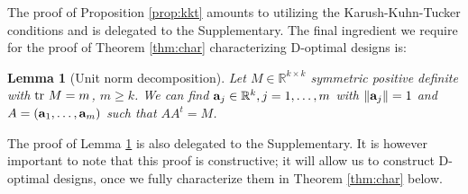 \documentclass[ba]{imsart}
\newcommand{\R}{\ensuremath{\mathbb{R}}}
\newcommand{\ttr}[1]{\textup{tr}\ #1}
\theoremstyle{plain}
\newtheorem{lemma}[theorem]{Lemma}
\theoremstyle{definition}
\theoremstyle{remark}
\begin{document}
The proof of Proposition \ref{prop:kkt} amounts to utilizing the
Karush-Kuhn-Tucker conditions and is delegated to the
Supplementary. The final ingredient we require for the proof of
Theorem \ref{thm:char} characterizing D-optimal designs is:


\begin{lemma}[Unit norm decomposition]\label{lemma:free}
  Let $M \in \R^{k \times k}$ symmetric positive definite with $\ttr M
  = m$, $m \geq k$. We can find $\func_j \in \R^k,j=1,\dots,m$
  with $\|\mathbf{a}_j\|=1$ and $A = (\mathbf{a}_1,\dots,\mathbf{a}_m)$ such that
  $AA^t = M$.
\end{lemma}

The proof of Lemma \ref{lemma:free} is also delegated to the
Supplementary. It is however important to note that this proof is
constructive; it will allow us to construct D-optimal designs, once we
fully characterize them in Theorem \ref{thm:char} below.
\end{document}
